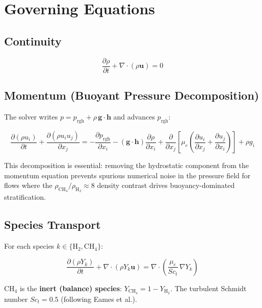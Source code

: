 \documentclass[12pt,a4paper]{report}
\begin{document}
\chapter{Governing Equations}
\label{ch:goveq}

\section{Continuity}

\[
  \frac{\partial \rho}{\partial t}
  + \nabla \!\cdot\! (\rho \mathbf{u}) = 0
\]

\section{Momentum (Buoyant Pressure Decomposition)}

The solver writes $p = p_{\mathrm{rgh}} + \rho\,\mathbf{g}\!\cdot\!
\mathbf{h}$ and advances $p_{\mathrm{rgh}}$:

\[
  \frac{\partial (\rho u_i)}{\partial t}
  + \frac{\partial (\rho u_i u_j)}{\partial x_j}
  = -\frac{\partial p_{\mathrm{rgh}}}{\partial x_i}
    - (\mathbf{g}\!\cdot\!\mathbf{h}) \frac{\partial \rho}{\partial x_i}
    + \frac{\partial}{\partial x_j}\!
      \left[\mu_e\!\left(\frac{\partial u_i}{\partial x_j}
      + \frac{\partial u_j}{\partial x_i}\right)\right]
    + \rho g_i
\]

This decomposition is essential: removing the hydrostatic component
from the momentum equation prevents spurious numerical noise in the
pressure field for flows where the $\rho_{\mathrm{CH_4}} / \rho_{\mathrm{H_2}}
\approx 8$ density contrast drives buoyancy-dominated stratification.

\section{Species Transport}

For each species $k \in \{\mathrm{H_2},\mathrm{CH_4}\}$:

\[
  \frac{\partial (\rho Y_k)}{\partial t}
  + \nabla\!\cdot\!(\rho Y_k \mathbf{u})
  = \nabla\!\cdot\!\left(\frac{\mu_e}{Sc_t}\, \nabla Y_k\right)
\]

\noindent CH$_4$ is the \textbf{inert (balance) species}:
$Y_{\mathrm{CH_4}} = 1 - Y_{\mathrm{H_2}}$.  The turbulent Schmidt
number $Sc_t = 0.5$ (following Eames et al.).
\end{document}
